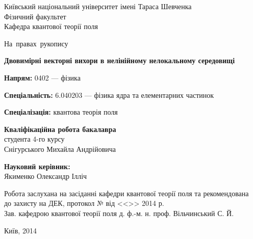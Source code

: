 \begin{titlepage}
\begin{center}
Київський національний університет імені Тараса Шевченка\\Фізичний факультет\\Кафедра квантової
теорії поля
\end{center}
\vspace*{1.5cm}
{}\hfill\mbox{На правах рукопису}

\vspace*{3cm}
\begin{center} {\bf\LARGE
Двовимірні векторні вихори в нелінійному нелокальному середовищі}
\end{center}
\medskip
\vspace*{0.7cm}
\begin{flushleft}
\parbox{9cm}{
\textbf{Напрям:} 0402 --- фізика

\textbf{Спеціальність:} 6.040203 --- фізика ядра та елементарних частинок

\textbf{Спеціалізація:} квантова теорія поля
}
\end{flushleft}
\vspace*{1cm}
{}\hfill\parbox{9cm}{\textbf{Кваліфікаційна робота бакалавра}\\
студента 4-го курсу\\ Снігурського Михайла Андрійовича}
\bigskip
\bigskip

{}\hfill\parbox{9cm}{\textbf{Науковий керівник:}\\
Якименко Олександр Ілліч}

\vfill
\vspace*{1.5cm}
{\small \noindent
  Робота заслухана на засіданні кафедри квантової теорії поля та рекомендована\\
  до захисту на ДЕК, протокол № \underline{\hspace{1.0cm}}  від <<\underline{\hspace{1.0cm}}>> \underline{\hspace{3.5cm}}2014 р.\\[0.4cm]
  Зав. кафедрою квантової теорії поля \hspace{1.8cm} д. ф.-м. н. проф. Вільчинський С. Й.\\[0.7cm]}
\vfill
\begin{center} Київ, 2014 \end{center}

\end{titlepage}